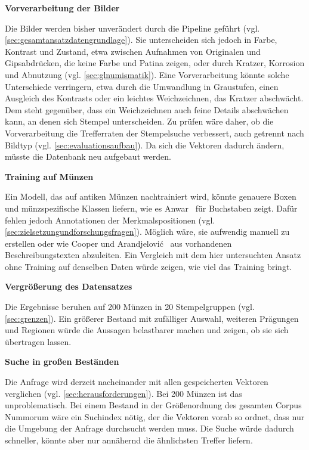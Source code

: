 \vspace{\baselineskip}

\noindent \textbf{Vorverarbeitung der Bilder}

\noindent Die Bilder werden bisher unverändert durch die Pipeline geführt (vgl. \cref{sec:gesamtansatzdatengrundlage}). Sie unterscheiden sich jedoch in Farbe, Kontrast und Zustand, etwa zwischen Aufnahmen von Originalen und Gipsabdrücken, die keine Farbe und Patina zeigen, oder durch Kratzer, Korrosion und Abnutzung (vgl. \cref{sec:glnumismatik}). Eine Vorverarbeitung könnte solche Unterschiede verringern, etwa durch die Umwandlung in Graustufen, einen Ausgleich des Kontrasts oder ein leichtes Weichzeichnen, das Kratzer abschwächt. Dem steht gegenüber, dass ein Weichzeichnen auch feine Details abschwächen kann, an denen sich Stempel unterscheiden. Zu prüfen wäre daher, ob die Vorverarbeitung die Trefferraten der Stempelsuche verbessert, auch getrennt nach Bildtyp (vgl. \cref{sec:evaluationsaufbau}). Da sich die Vektoren dadurch ändern, müsste die Datenbank neu aufgebaut werden.

\vspace{\baselineskip}

\noindent \textbf{Training auf Münzen}

\noindent Ein Modell, das auf antiken Münzen nachtrainiert wird, könnte genauere Boxen und münzspezifische Klassen liefern, wie es Anwar~\cite{anwar2026reading} für Buchstaben zeigt. Dafür fehlen jedoch Annotationen der Merkmalspositionen (vgl. \cref{sec:zielsetzungundforschungsfragen}). Möglich wäre, sie aufwendig manuell zu erstellen oder wie Cooper und Arandjelović~\cite{cooper2020learning} aus vorhandenen Beschreibungstexten abzuleiten. Ein Vergleich mit dem hier untersuchten Ansatz ohne Training auf denselben Daten würde zeigen, wie viel das Training bringt.

\vspace{\baselineskip}

\noindent \textbf{Vergrößerung des Datensatzes}

\noindent Die Ergebnisse beruhen auf 200 Münzen in 20 Stempelgruppen (vgl. \cref{sec:grenzen}). Ein größerer Bestand mit zufälliger Auswahl, weiteren Prägungen und Regionen würde die Aussagen belastbarer machen und zeigen, ob sie sich übertragen lassen.

\vspace{\baselineskip}

\noindent \textbf{Suche in großen Beständen}

\noindent Die Anfrage wird derzeit nacheinander mit allen gespeicherten Vektoren verglichen (vgl. \cref{sec:herausforderungen}). Bei 200 Münzen ist das unproblematisch. Bei einem Bestand in der Größenordnung des gesamten Corpus Nummorum wäre ein Suchindex nötig, der die Vektoren vorab so ordnet, dass nur die Umgebung der Anfrage durchsucht werden muss. Die Suche würde dadurch schneller, könnte aber nur annähernd die ähnlichsten Treffer liefern.

